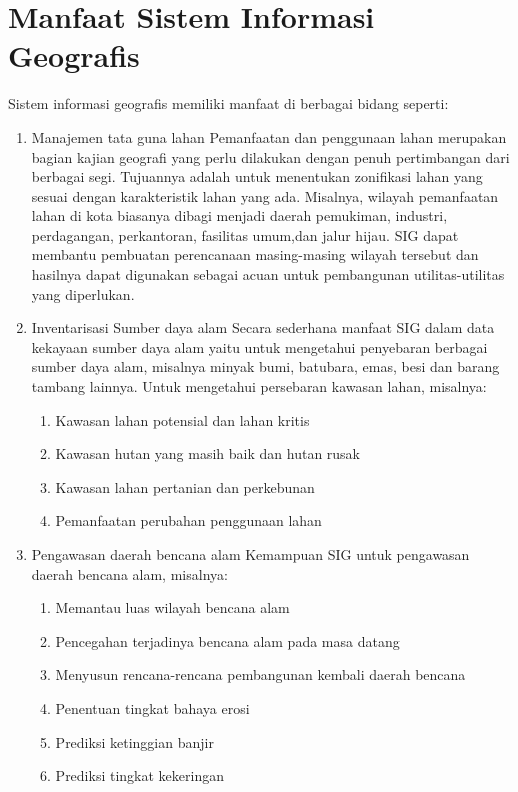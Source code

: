 \section{Manfaat Sistem Informasi Geografis}
Sistem informasi geografis memiliki manfaat di berbagai bidang seperti:
\begin{enumerate}
\item Manajemen tata guna lahan
\subitem Pemanfaatan dan penggunaan lahan merupakan bagian kajian geografi yang perlu dilakukan dengan penuh pertimbangan dari berbagai segi. Tujuannya adalah untuk menentukan zonifikasi lahan yang sesuai dengan karakteristik lahan yang ada. Misalnya, wilayah pemanfaatan lahan di kota biasanya dibagi menjadi daerah pemukiman, industri, perdagangan, perkantoran, fasilitas umum,dan jalur hijau. SIG dapat membantu pembuatan perencanaan masing-masing wilayah tersebut dan hasilnya dapat digunakan sebagai acuan untuk pembangunan utilitas-utilitas yang diperlukan.

\item Inventarisasi Sumber daya alam
\subitem Secara sederhana manfaat SIG dalam data kekayaan sumber daya alam yaitu untuk mengetahui penyebaran berbagai sumber daya alam, misalnya minyak bumi, batubara, emas, besi dan barang tambang lainnya. Untuk mengetahui persebaran kawasan lahan, misalnya:
\begin{enumerate}
\item Kawasan lahan potensial dan lahan kritis
\item Kawasan hutan yang masih baik dan hutan rusak
\item Kawasan lahan pertanian dan perkebunan
\item Pemanfaatan perubahan penggunaan lahan
\end{enumerate}

\item Pengawasan daerah bencana alam
\subitem Kemampuan SIG untuk pengawasan daerah bencana alam, misalnya:
\begin{enumerate}
\item Memantau luas wilayah bencana alam
\item Pencegahan terjadinya bencana alam pada masa datang
\item Menyusun rencana-rencana pembangunan kembali daerah bencana
\item Penentuan tingkat bahaya erosi
\item Prediksi ketinggian banjir
\item Prediksi tingkat kekeringan
\end{enumerate}
 

\end{enumerate}
